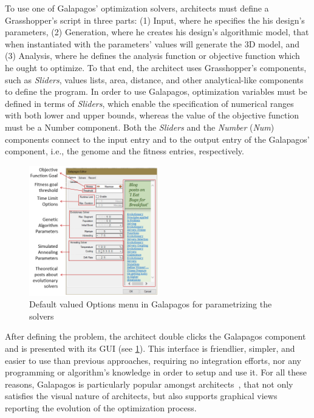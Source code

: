 	To use one of Galapagos' optimization solvers, architects must define a Grasshopper's script in three parts: (1) Input, where he specifies the his design's parameters, (2) Generation, where he creates his design's algorithmic model, that when instantiated with the parameters' values will generate the 3D model, and (3) Analysis, where he defines the analysis function or objective function which he ought to optimize. To that end, the architect uses Grasshopper's components, such as \textit{Sliders}, values lists, area, distance, and other analytical-like components to define the program. In order to use Galapagos, optimization variables must be defined in terms of \textit{Sliders}, which enable the specification of numerical ranges with both lower and upper bounds, whereas the value of the objective function must be a Number component. Both the \textit{Sliders} and the \textit{Number} (\textit{Num}) components connect to the input entry and to the output entry of the Galapagos' component, i.e., the genome and the fitness entries, respectively. 

\begin{figure}
\centering
\includegraphics[width=0.5\textwidth]{Images/Background/Galapagos/galapagos-options-menu.PNG}
\caption[Galapagos algorithm's configuration menu]{Default valued Options menu in Galapagos for parametrizing the solvers}
\label{fig:galapagossetup}
\end{figure}
	
	After defining the problem, the architect double clicks the Galapagos component and is presented with its \ac{GUI} (see \cref{fig:galapagossetup}). This interface is friendlier, simpler, and easier to use than previous approaches, requiring no integration efforts, nor any programming or algorithm's knowledge in order to setup and use it. For all these reasons, Galapagos is particularly popular amongst architects~\cite{Wortmann2017ADO}, that not only satisfies the visual nature of architects, but also supports graphical views reporting the evolution of the optimization process. 
	
